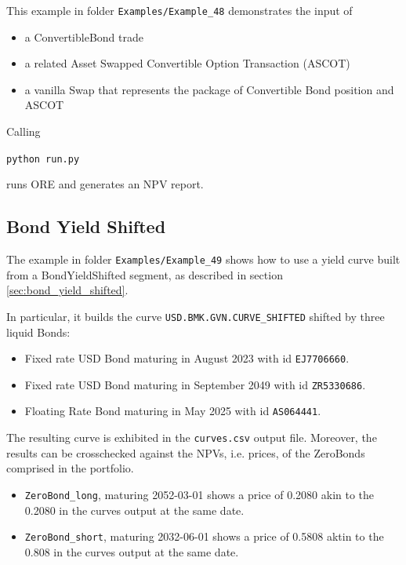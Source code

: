 This example in folder {\tt Examples/Example\_48} demonstrates the input of
\begin{itemize}
\item a ConvertibleBond  trade
\item a related Asset Swapped Convertible Option Transaction (ASCOT)
\item a vanilla Swap that represents the package of Convertible Bond position and ASCOT
\end{itemize}

Calling
\medskip
\centerline{\tt python run.py}

\medskip
runs ORE and generates an NPV report.

\subsection{Bond Yield Shifted}%
\label{example:49}

The example in folder {\tt Examples/Example\_49} shows how to use a yield curve
built from a BondYieldShifted segment, as described in section \ref{sec:bond_yield_shifted}.

In particular, it builds the curve {\tt USD.BMK.GVN.CURVE\_SHIFTED} shifted by three liquid Bonds:

\begin{itemize}
\item Fixed rate USD Bond maturing in August 2023 with id {\tt EJ7706660}.
\item Fixed rate USD Bond maturing in September 2049 with id {\tt ZR5330686}.
\item Floating Rate Bond maturing in May 2025 with id {\tt AS064441}.
\end{itemize}

The resulting curve is exhibited in the {\tt curves.csv} output file.
Moreover, the results can be crosschecked against the NPVs, i.e. prices, of the ZeroBonds comprised in the portfolio.
\begin{itemize}
\item {\tt ZeroBond\_long}, maturing 2052-03-01 shows a price of 0.2080 akin to the 0.2080 in the curves output at the same date.
\item {\tt ZeroBond\_short}, maturing 2032-06-01 shows a price of 0.5808 aktin to the 0.808 in the curves output at the same date.
\end{itemize}

